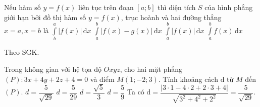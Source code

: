 \begin{ex}%
	Nếu hàm số $y=f(x)$ liên tục trên đoạn $[a; b]$ thì diện tích $S$ của hình phẳng giới hạn bởi đồ thị hàm số $y=f(x)$, trục hoành và hai đường thẳng $x=a, x = b$ là  
	\choice
	{$\displaystyle\int\limits_b^a \left| f(x) \right| \mathrm{\,d}x$}
	{$\displaystyle\int\limits_a^b \left| f(x) - g(x) \right| \mathrm{\,d}x$}
	{\True $\displaystyle\int\limits_a^b \left| f(x) \right| \mathrm{\,d}x$}
	{$\displaystyle\int\limits_a^b f(x) \mathrm{\,d}x$}
	\loigiai
	{Theo SGK.
		
	}
\end{ex}

\begin{ex}%
	Trong không gian với hệ tọa độ $Oxyz$, cho hai mặt phẳng $(P) \colon 3x + 4y + 2z + 4 = 0$ và điểm $M(1; -2; 3)$. Tính khoảng cách $\mathrm{d}$ từ $M$ đến $(P)$.  
	\choice
	{\True $d=\dfrac{5}{\sqrt{29}}$}
	{$d=\dfrac{5}{29}$}
	{$d=\dfrac{\sqrt{5}}{3}$}
	{$d=\dfrac{5}{9}$}
	\loigiai
	{
		Ta có $\mathrm{d}=\dfrac{\left|3\cdot 1 - 4\cdot 2 + 2\cdot 3 + 4 \right|}{\sqrt{3^2 + 4^2 + 2^2}} = \dfrac{5}{\sqrt{29}}$.	
	}
\end{ex}

